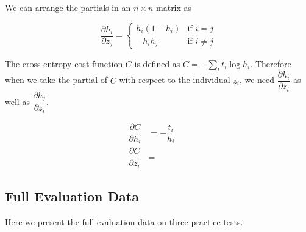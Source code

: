 \documentclass[pageno]{final_paper}
\begin{document}
We can arrange the partials in an $n\times n$ matrix as

$$
\dfrac{\partial h_i}{\partial z_j} =
\begin{cases}
    h_i(1-h_i) & \text{if } i = j \\
    -h_ih_j & \text{if } i \neq j
\end{cases}
$$

The cross-entropy cost function $C$ is defined as $C = -\sum_i t_i \log h_i$.
Therefore when we take the partial of $C$ with respect to the individual $z_i$,
we need $\dfrac{\partial h_i}{\partial z_i}$ as well as $\dfrac{\partial
h_j}{\partial z_i}$.

\begin{equation}
    \label{eq: loss function partial to h}
    \begin{aligned}
        \dfrac{\partial C}{\partial h_i} &= -\dfrac{t_i}{h_i}
        &\phantom{=} \\
        \dfrac{\partial C}{\partial z_i} &=
    \end{aligned}
\end{equation}



\subsection{Full Evaluation Data}
\label{Full Evaluation Data}
Here we present the full evaluation data on three practice tests.
\end{document}
